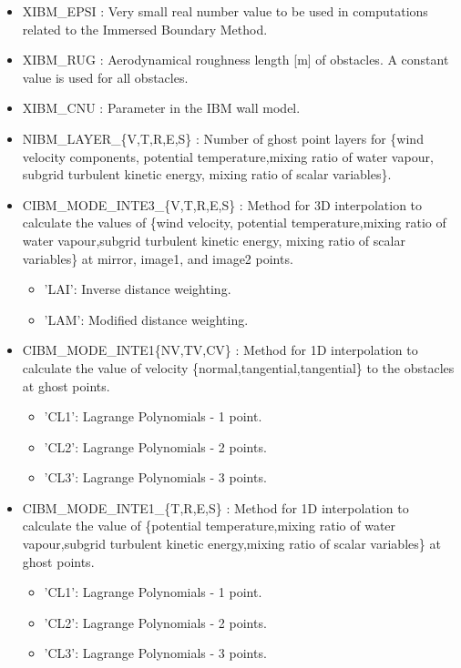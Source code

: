\begin{itemize}
\item XIBM\_EPSI :
Very small real number value to be used in computations related to the
Immersed Boundary Method.
  
\item XIBM\_RUG :
Aerodynamical roughness length [m] of obstacles. A constant value
is used for all obstacles.
  
\item XIBM\_CNU :
Parameter in the IBM wall model.

\item NIBM\_LAYER\_\{V,T,R,E,S\} :
Number of ghost point layers for \{wind velocity components,
potential temperature,mixing ratio of water vapour, subgrid turbulent
kinetic energy, mixing ratio of scalar variables\}.

\item CIBM\_MODE\_INTE3\_\{V,T,R,E,S\} :
Method for 3D interpolation to calculate the values of \{wind velocity,
potential temperature,mixing ratio of water vapour,subgrid turbulent kinetic energy,
mixing ratio of scalar variables\} at mirror, image1, and image2 points.
\begin{itemize}
\item 'LAI': Inverse distance weighting.
\item 'LAM': Modified distance weighting.
\end{itemize}

\item CIBM\_MODE\_INTE1\{NV,TV,CV\} :
Method for 1D interpolation to calculate the value of velocity
\{normal,tangential,tangential\} to the obstacles at ghost points.
\begin{itemize}
\item 'CL1': Lagrange Polynomials - 1 point.
\item 'CL2': Lagrange Polynomials - 2 points.
\item 'CL3': Lagrange Polynomials - 3 points.
\end{itemize}

\item CIBM\_MODE\_INTE1\_\{T,R,E,S\} :
Method for 1D interpolation to calculate the value of \{potential
temperature,mixing ratio of water vapour,subgrid turbulent kinetic energy,mixing
ratio of scalar variables\} at ghost points.
\begin{itemize}
\item 'CL1': Lagrange Polynomials - 1 point.
\item 'CL2': Lagrange Polynomials - 2 points.
\item 'CL3': Lagrange Polynomials - 3 points.
\end{itemize}


\end{itemize}
